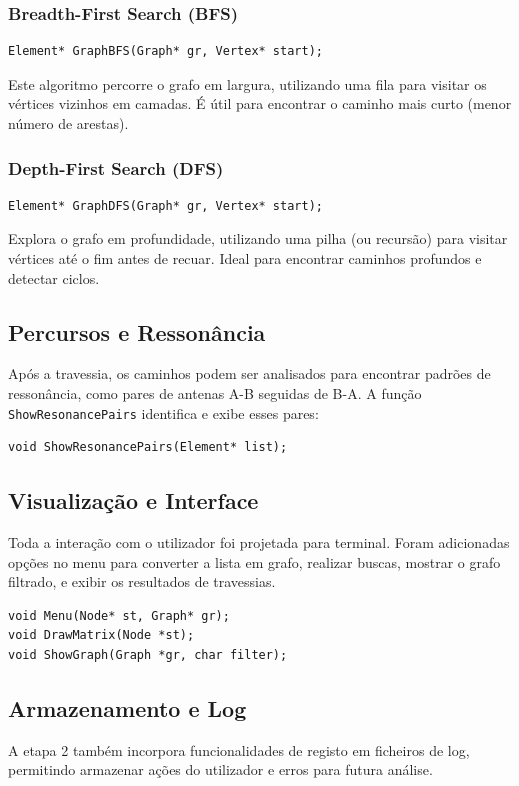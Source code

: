 \documentclass[a4paper,12pt]{article}
\begin{document}
\subsubsection{Breadth-First Search (BFS)}
\begin{lstlisting}[style=CStyle]
Element* GraphBFS(Graph* gr, Vertex* start);
\end{lstlisting}
Este algoritmo percorre o grafo em largura, utilizando uma fila para visitar os vértices vizinhos em camadas. É útil para encontrar o caminho mais curto (menor número de arestas).

\subsubsection{Depth-First Search (DFS)}
\begin{lstlisting}[style=CStyle]
Element* GraphDFS(Graph* gr, Vertex* start);
\end{lstlisting}
Explora o grafo em profundidade, utilizando uma pilha (ou recursão) para visitar vértices até o fim antes de recuar. Ideal para encontrar caminhos profundos e detectar ciclos.

\subsection{Percursos e Ressonância}
Após a travessia, os caminhos podem ser analisados para encontrar padrões de ressonância, como pares de antenas A-B seguidas de B-A. A função \texttt{ShowResonancePairs} identifica e exibe esses pares:

\begin{lstlisting}[style=CStyle]
void ShowResonancePairs(Element* list);
\end{lstlisting}

\subsection{Visualização e Interface}
Toda a interação com o utilizador foi projetada para terminal. Foram adicionadas opções no menu para converter a lista em grafo, realizar buscas, mostrar o grafo filtrado, e exibir os resultados de travessias.

\begin{lstlisting}[style=CStyle]
void Menu(Node* st, Graph* gr);
void DrawMatrix(Node *st);
void ShowGraph(Graph *gr, char filter);
\end{lstlisting}

\subsection{Armazenamento e Log}
A etapa 2 também incorpora funcionalidades de registo em ficheiros de log, permitindo armazenar ações do utilizador e erros para futura análise.
\end{document}
